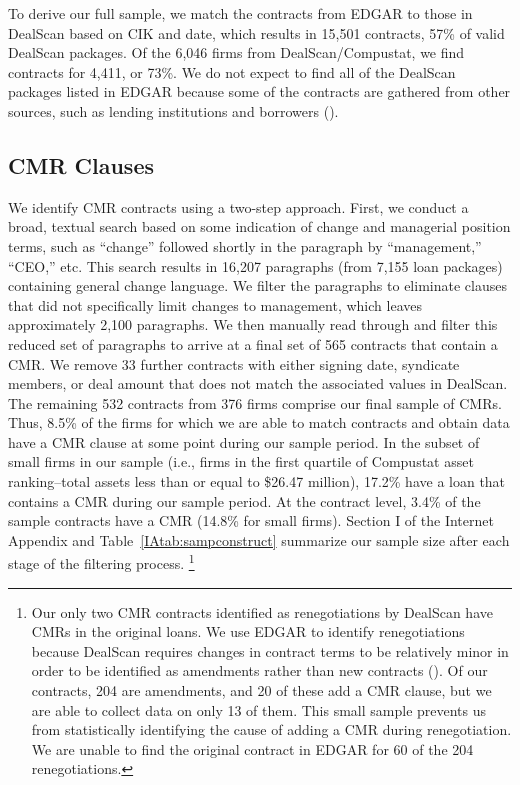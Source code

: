 \documentclass[a4paper,12pt]{article}
\begin{document}
To derive our full sample, we match the contracts from EDGAR to those in DealScan based on CIK and date, which results in 15,501 contracts, 57\% of valid DealScan packages.
Of the 6,046 firms from DealScan/Compustat, we find contracts for 4,411, or 73\%.
We do not expect to find all of the DealScan packages listed in EDGAR because some of the contracts are gathered from other sources, such as lending institutions and borrowers (\citet{Nini_2009, Bradley_2015}).



\subsection{CMR Clauses}

We identify CMR contracts using a two-step approach.
First, we conduct a broad, textual search based on some indication of change and managerial position terms, such as ``change'' followed shortly in the paragraph by ``management,'' ``CEO,'' etc.
This search results in 16,207 paragraphs (from 7,155 loan packages) containing general change language.
We filter the paragraphs to eliminate clauses that did not specifically limit changes to management, which leaves approximately 2,100 paragraphs.
We then manually read through and filter this reduced set of paragraphs to arrive at a final set of 565 contracts that contain a CMR.
We remove 33 further contracts with either signing date, syndicate members, or deal amount that does not match the associated values in DealScan.
The remaining 532 contracts from 376 firms comprise our final sample of CMRs.
Thus, 8.5\%  of the  firms for which we are able to match contracts and obtain data have a CMR clause at some point during our sample period.
In the subset of small firms in our sample (i.e., firms in the first quartile of Compustat asset ranking--total assets less than or equal to \$26.47 million), 17.2\% have a loan that contains a CMR during our sample period.
At the contract level, 3.4\% of the sample contracts have a CMR (14.8\% for small firms).
Section I of the Internet Appendix and Table~\ref{IAtab:sampconstruct} summarize our sample size after each stage of the filtering process.%
	\footnote{Our only two CMR contracts identified as renegotiations by DealScan have CMRs in the original loans. We use EDGAR to identify renegotiations because DealScan requires changes in contract terms to be relatively minor in order to be identified as amendments rather than new contracts (\citet{Nini_2009}).
	Of our contracts, 204 are amendments, and 20 of these add a CMR clause, but we are able to collect data on only 13 of them. This small sample prevents us from statistically identifying the cause of adding a CMR during renegotiation. We are unable to find the original contract in EDGAR for 60 of the 204 renegotiations.}
\end{document}
